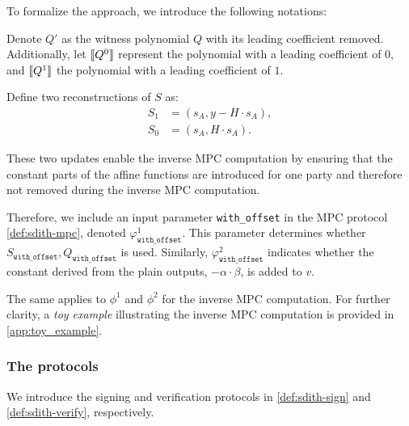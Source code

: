 \documentclass[11pt]{report}
\theoremstyle{definition}
\theoremstyle{plain}
\begin{document}
To formalize the approach, we introduce the following notations:

Denote $Q'$ as the witness polynomial $Q$ with its leading coefficient removed. Additionally, let $\llbracket Q^0 \rrbracket$ represent the polynomial with a leading coefficient of $0$, and $\llbracket Q^1 \rrbracket$ the polynomial with a leading coefficient of $1$.

Define two reconstructions of $S$ as:
\begin{align*}
  S_1 & = (s_A, y - H \cdot s_A), \\
  S_0 & = (s_A, H \cdot s_A).
\end{align*}

These two updates enable the inverse MPC computation by ensuring that the constant parts of the affine functions are introduced for one party and therefore not removed during the inverse MPC computation.

Therefore, we include an input parameter \texttt{with\_offset} in the MPC protocol \autoref{def:sdith-mpc}, denoted $\varphi^1_{\texttt{with\_offset}}$. This parameter determines whether $S_{\texttt{with\_offset}}, Q_{\texttt{with\_offset}}$ is used. Similarly, $\varphi^2_{\texttt{with\_offset}}$ indicates whether the constant derived from the plain outputs, $-\alpha \cdot \beta$, is added to $v$.

The same applies to $\phi^1$ and $\phi^2$ for the inverse MPC computation. For further clarity, a \textit{toy example} illustrating the inverse MPC computation is provided in \autoref{app:toy_example}.

\subsubsection{The protocols}
We introduce the signing and verification protocols in \autoref{def:sdith-sign} and \autoref{def:sdith-verify}, respectively.
\end{document}
